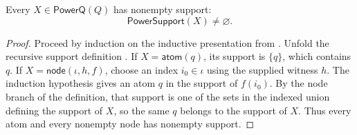 \begin{lemma}
Every $X\in\mathsf{PowerQ}(Q)$ has nonempty support:
\[
\mathsf{PowerSupport}(X)\ne\varnothing.
\]
\end{lemma}
\begin{proof}
Proceed by induction on the inductive presentation from
.  Unfold the recursive support definition
.  If $X=\mathsf{atom}(q)$, its support is $\{q\}$,
which contains $q$.  If $X=\mathsf{node}(\iota,h,f)$, choose an index
$i_0\in\iota$ using the supplied witness $h$.  The induction hypothesis
gives an atom $q$ in the support of $f(i_0)$.  By the node branch of the
definition, that support is one of the sets in the indexed union defining
the support of $X$, so the same $q$ belongs to the support of $X$.  Thus
every atom and every nonempty node has nonempty support.
\end{proof}
